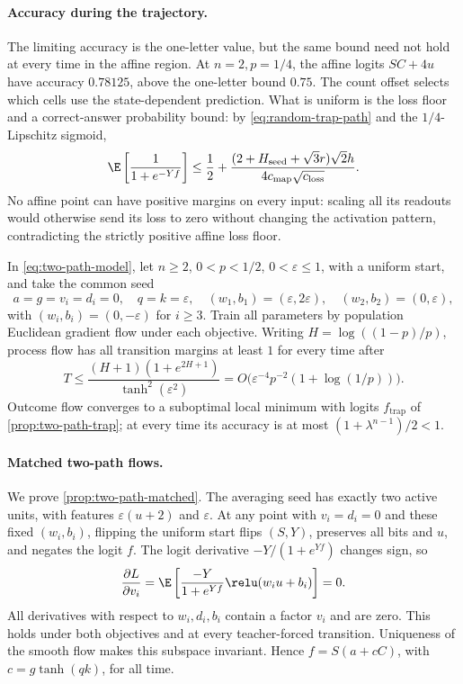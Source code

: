 \paragraph{Accuracy during the trajectory.}
The limiting accuracy is the one-letter value, but the same bound need not hold
at every time in the affine region. At $n=2,p=1/4$, the affine logits $SC+4u$
have accuracy $0.78125$, above the one-letter bound $0.75$.
The count offset selects which cells use the state-dependent prediction.
What is uniform is the loss floor and a correct-answer probability bound:
by \cref{eq:random-trap-path} and the $1/4$-Lipschitz sigmoid,
\[
 \E\left[\frac1{1+e^{-Yf}}\right]
 \le\frac12+
 \frac{(2+H_{\mathrm{seed}}+\sqrt3r)\sqrt2h}
      {4c_{\mathrm{map}}\sqrt{c_{\mathrm{loss}}}}.
\]
No affine point can have positive margins on every input: scaling all its readouts
would otherwise send its loss to zero without changing the activation pattern,
contradicting the strictly positive affine loss floor.

\begin{proposition}
\label{prop:two-path-matched}
In \cref{eq:two-path-model}, let $n\ge2$, $0<p<1/2$, $0<\varepsilon\le1$,
with a uniform start, and take the common seed
\[
 a=g=v_i=d_i=0,\quad q=k=\varepsilon,\quad
 (w_1,b_1)=(\varepsilon,2\varepsilon),\quad (w_2,b_2)=(0,\varepsilon),
\]
with $(w_i,b_i)=(0,-\varepsilon)$ for $i\ge3$.
Train all parameters by population Euclidean gradient flow under each objective.
Writing $H=\log((1-p)/p)$, process flow has all transition margins at least $1$
for every time after
\[
 T\le \frac{(H+1)(1+e^{2H+1})}{\tanh^2(\varepsilon^2)}
 =O\bigl(\varepsilon^{-4}p^{-2}(1+\log(1/p))\bigr).
\]
Outcome flow converges to a suboptimal local minimum with logits
$f_{\mathrm{trap}}$ of \cref{prop:two-path-trap}; at every time its accuracy is
at most $(1+\lambda^{n-1})/2<1$.
\end{proposition}

\paragraph{Matched two-path flows.}
\label{app:two-path-matched}
We prove \cref{prop:two-path-matched}. The averaging seed has exactly two active
units, with features $\varepsilon(u+2)$ and $\varepsilon$.
At any point with $v_i=d_i=0$ and these fixed $(w_i,b_i)$, flipping the uniform
start flips $(S,Y)$, preserves all bits and $u$, and negates the logit $f$.
The logit derivative $-Y/(1+e^{Yf})$ changes sign, so
\[
 \frac{\partial L}{\partial v_i}
 =\E\left[\frac{-Y}{1+e^{Yf}}\relu(w_i u+b_i)\right]=0.
\]
All derivatives with respect to $w_i,d_i,b_i$ contain a factor $v_i$ and are zero.
This holds under both objectives and at every teacher-forced transition.
Uniqueness of the smooth flow makes this subspace invariant. Hence
$f=S(a+cC)$, with $c=g\tanh(qk)$, for all time.

